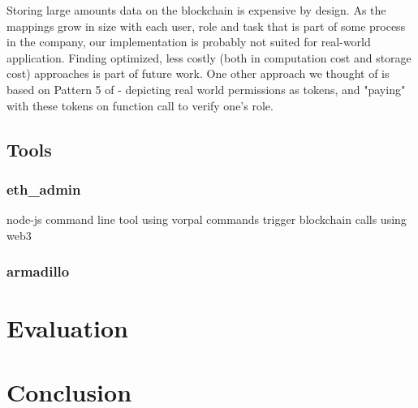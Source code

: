 \documentclass[runningheads]{llncs}
\begin{document}
Storing large amounts data on the blockchain is expensive by design.
As the mappings grow in size with each user, role and task that is part of some process in the company, our implementation is probably not suited for real-world application.
Finding optimized, less costly (both in computation cost and storage cost) approaches is part of future work.
One other approach we thought of is based on Pattern 5 of \cite{xu2018pattern} - depicting real world permissions as tokens, and "paying" with these tokens on function call to verify one's role.

\subsection{Tools}

\subsubsection{eth\_admin}

node-js command line tool using vorpal
commands trigger blockchain calls using web3

\subsubsection{armadillo}

\section{Evaluation}


\section{Conclusion}

%
%
%


\end{document}
